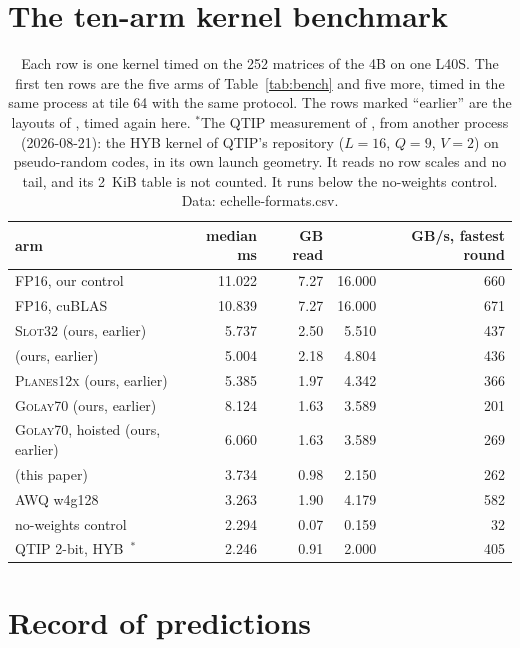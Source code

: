 \section{The ten-arm kernel benchmark}
\label{app:bench}

\begin{table}[H]
\centering\small\setlength{\tabcolsep}{5pt}
\caption{Each row is one kernel timed on the 252 matrices of the 4B on one L40S.
The first ten rows are the five arms of Table~\ref{tab:bench} and five more,
timed in the same process at tile 64 with the same protocol. The rows marked
``earlier'' are the layouts of \citet{llvq1preprint}, timed again here.
$^{*}$The QTIP measurement of \citet{llvq1preprint}, from another process
(2026-08-21): the HYB kernel of QTIP's repository ($L=16$, $Q=9$, $V=2$) on
pseudo-random codes, in its own launch geometry. It reads no row scales and no
tail, and its 2~KiB table is not counted. It runs below the no-weights
control. Data: echelle-formats.csv.}
\begin{tabular}{lrrrr}
\toprule
arm & median ms & GB read & \bw{} & GB/s, fastest round\\
\midrule
FP16, our control & 11.022 & 7.27 & 16.000 & 660\\
FP16, cuBLAS & 10.839 & 7.27 & 16.000 & 671\\
\textsc{Slot32} (ours, earlier) & 5.737 & 2.50 & 5.510 & 437\\
\Planes{} (ours, earlier) & 5.004 & 2.18 & 4.804 & 436\\
\textsc{Planes12x} (ours, earlier) & 5.385 & 1.97 & 4.342 & 366\\
\textsc{Golay70} (ours, earlier) & 8.124 & 1.63 & 3.589 & 201\\
\textsc{Golay70}, hoisted (ours, earlier) & 6.060 & 1.63 & 3.589 & 269\\
\Tetra{} (this paper) & 3.734 & 0.98 & 2.150 & 262\\
AWQ w4g128~\citep{awq2024} & 3.263 & 1.90 & 4.179 & 582\\
no-weights control & 2.294 & 0.07 & 0.159 & 32\\
QTIP 2-bit, HYB~\citep{qtip2024}$^{*}$ & 2.246 & 0.91 & 2.000 & 405\\
\bottomrule
\end{tabular}
\end{table}

\section{Record of predictions}
\label{app:record}

